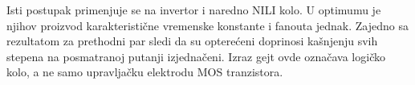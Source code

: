 Isti postupak primenjuje se na invertor i naredno NILI kolo. U optimumu je njihov proizvod karakteristične vremenske konstante i fanouta jednak. Zajedno sa rezultatom za prethodni par sledi da su opterećeni doprinosi kašnjenju svih stepena na posmatranoj putanji izjednačeni. Izraz gejt ovde označava logičko kolo, a ne samo upravljačku elektrodu MOS tranzistora.
